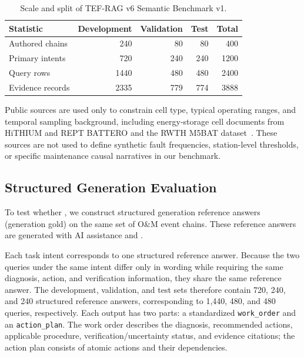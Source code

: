\begin{table}[t]
\caption{Scale and split of TEF-RAG v6 Semantic Benchmark v1.}
\label{tab:dataset_stats}
\centering
\small
\begin{tabular}{lrrrr}
\toprule
Statistic & Development & Validation & Test & Total \\
\midrule
Authored chains & 240 & 80 & 80 & 400 \\
Primary intents & 720 & 240 & 240 & 1200 \\
Query rows & 1440 & 480 & 480 & 2400 \\
Evidence records & 2335 & 779 & 774 & 3888 \\
\bottomrule
\end{tabular}
\end{table}

Public sources are used only to constrain cell type, typical operating ranges, and temporal sampling background, including energy-storage cell documents from HiTHIUM and REPT BATTERO and the RWTH M5BAT dataset~\cite{hithium2023v11,hithium2024v33,rept2025,rwth2026m5bat}. These sources are not used to define synthetic fault frequencies, station-level thresholds, or specific maintenance causal narratives in our benchmark.

\subsection{Structured Generation Evaluation}

To test whether , we construct structured generation reference answers (generation gold) on the same set of O\&M event chains. %
These reference answers are generated with AI assistance and .

Each task intent corresponds to one structured reference answer. Because the two queries under the same intent differ only in wording while requiring the same diagnosis, action, and verification information, they share the same reference answer. The development, validation, and test sets therefore contain 720, 240, and 240 structured reference answers, corresponding to 1,440, 480, and 480 queries, respectively. Each output has two parts: a standardized \texttt{work\_order} and an \texttt{action\_plan}. The work order describes the diagnosis, recommended actions, applicable procedure, verification/uncertainty status, and evidence citations; the action plan consists of atomic actions and their dependencies.

